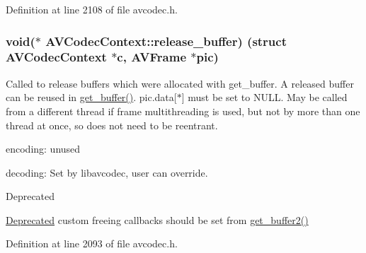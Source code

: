 Definition at line 2108 of file avcodec.\+h.

\subsubsection[{\texorpdfstring{release\+\_\+buffer}{release_buffer}}]{ {\bf void}($\ast$ A\+V\+Codec\+Context\+::release\+\_\+buffer) (struct {\bf A\+V\+Codec\+Context} $\ast${\bf c}, {\bf A\+V\+Frame} $\ast$pic)}\hypertarget{struct_a_v_codec_context_ac934a388c7779e800c13914ff00b6916}{}\label{struct_a_v_codec_context_ac934a388c7779e800c13914ff00b6916}
Called to release buffers which were allocated with get\+\_\+buffer. A released buffer can be reused in \hyperlink{struct_a_v_codec_context_abc3a806b73306162efa218510448d54f}{get\+\_\+buffer()}. pic.\+data\mbox{[}$\ast$\mbox{]} must be set to N\+U\+LL. May be called from a different thread if frame multithreading is used, but not by more than one thread at once, so does not need to be reentrant.
\begin{DoxyItemize}
\item encoding\+: unused
\item decoding\+: Set by libavcodec, user can override.
\end{DoxyItemize}

\begin{DoxyRefDesc}{Deprecated}
\item[\hyperlink{deprecated__deprecated000018}{Deprecated}]custom freeing callbacks should be set from \hyperlink{struct_a_v_codec_context_aef79333a4c6abf1628c55d75ec82bede}{get\+\_\+buffer2()} \end{DoxyRefDesc}


Definition at line 2093 of file avcodec.\+h.

